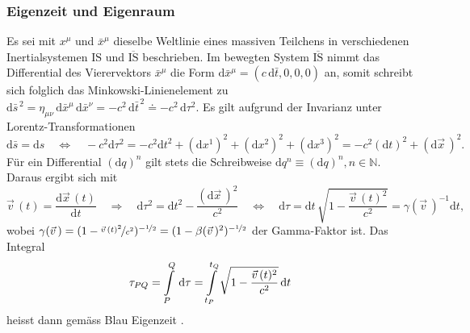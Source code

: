 \documentclass[a4paper,12pt]{article}
\numberwithin{equation}{section}
\begin{document}
\subsubsection{Eigenzeit und Eigenraum}
Es sei mit $x^\mu$ und $\bar{x}^\mu$ dieselbe Weltlinie eines massiven Teilchens in verschiedenen Inertialsystemen $\textrm{IS}$ und $\overline{\textrm{IS}}$ beschrieben. Im bewegten System $\overline{\textrm{IS}}$ nimmt das Differential des Vierervektors $\bar{x}^\mu$ die Form  $\mathrm{d}\bar{x}^\mu = (c\,\mathrm{d}\bar{t},0,0,0)$ an, somit schreibt sich folglich das Minkowski-Linienelement zu $\mathrm{d}\bar{s}^{\,2} = \eta_{\mu\nu}\,\mathrm{d}\bar{x}^\mu\,\mathrm{d}\bar{x}^\nu = -c^2\,\mathrm{d}\bar{t}^{\,2} \doteq -c^2\,\mathrm{d}\tau^2.$
Es gilt aufgrund der Invarianz unter Lorentz-Transformationen \begin{equation}
\mathrm{d}\bar{s} = \mathrm{d}s \quad \Leftrightarrow \quad -c^2\mathrm{d}\tau^2 = -c^2\mathrm{d}t^2 + (\mathrm{d}x^1)^2 + (\mathrm{d}x^2)^2 + (\mathrm{d}x^3)^2 = -c^2(\mathrm{d}t)^2 + (\mathrm{d}\vec{x}\,)^2.
\end{equation} Für ein Differential $(\mathrm{d}q)^n$ gilt stets die Schreibweise $\mathrm{d}q^n \equiv (\mathrm{d}q)^n, n \in \mathbb{N}$. Daraus ergibt sich mit \begin{equation}
\vec{v}\,(t) = \frac{\mathrm{d}\vec{x}\,(t)}{\mathrm{d}t} \quad \Rightarrow \quad \mathrm{d}\tau^2 = \mathrm{d}t^2-\frac{(\mathrm{d}\vec{x}\,)^{2}}{c^2} \quad \Leftrightarrow \quad \mathrm{d}\tau = \mathrm{d}t\,\sqrt{1-\frac{\vec{v}\,(t)^2}{c^2}} = \gamma(\vec{v}\,)^{-1}\mathrm{d}t,
\end{equation} wobei $\gamma(\vec{v}\,) = (1-\nicefrac{\vec{v}\,(t)^2}{c^2})^{-\nicefrac{1}{2}} = (1-\beta(\vec{v}\,)^2)^{-\nicefrac{1}{2}}$ der Gamma-Faktor ist. Das Integral \begin{equation}
\tau_{PQ} = \int\displaylimits_{P}^{Q} \, \mathrm{d}\tau = \int\displaylimits_{t_P}^{t_Q} \sqrt{1-\frac{\vec{v}\,(t)^2}{c^2}} \,\mathrm{d}t
\end{equation} heisst dann gemäss Blau Eigenzeit \cite[S.21]{Blau.2021}.
\end{document}
